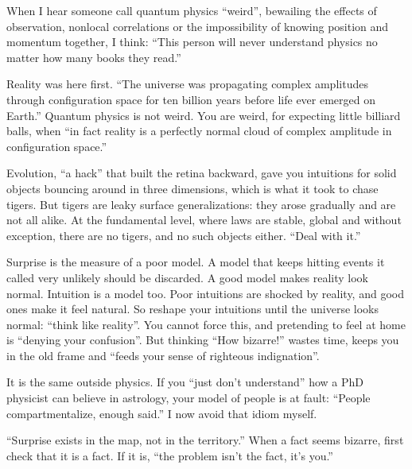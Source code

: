 
When I hear someone call quantum physics ``weird'', bewailing the effects of observation, nonlocal correlations or the impossibility of knowing position and momentum together, I think: ``This person will never understand physics no matter how many books they read.'' 

Reality was here first. ``The universe was propagating complex amplitudes through configuration space for ten billion years before life ever emerged on Earth.'' Quantum physics is not weird. You are weird, for expecting little billiard balls, when ``in fact reality is a perfectly normal cloud of complex amplitude in configuration space.'' 

Evolution, ``a hack'' that built the retina backward, gave you intuitions for solid objects bouncing around in three dimensions, which is what it took to chase tigers. But tigers are leaky surface generalizations: they arose gradually and are not all alike. At the fundamental level, where laws are stable, global and without exception, there are no tigers, and no such objects either. ``Deal with it.'' 

Surprise is the measure of a poor model. A model that keeps hitting events it called very unlikely should be discarded. A good model makes reality look normal. Intuition is a model too. Poor intuitions are shocked by reality, and good ones make it feel natural. So reshape your intuitions until the universe looks normal: ``think like reality''. You cannot force this, and pretending to feel at home is ``denying your confusion''. But thinking ``How bizarre!'' wastes time, keeps you in the old frame and ``feeds your sense of righteous indignation''. 

It is the same outside physics. If you ``just don't understand'' how a PhD physicist can believe in astrology, your model of people is at fault: ``People compartmentalize, enough said.'' I now avoid that idiom myself.

``Surprise exists in the map, not in the territory.'' When a fact seems bizarre, first check that it is a fact. If it is, ``the problem isn't the fact, it's you.''
